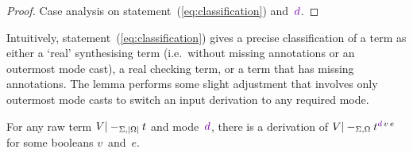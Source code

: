 \begin{proof}
Case analysis on statement~(\ref{eq:classification}) and~$\dir{d}$.
\end{proof}

Intuitively, statement~(\ref{eq:classification}) gives a precise classification of a term as either a `real' synthesising term (i.e.~without missing annotations or an outermost mode cast), a real checking term, or a term that has missing annotations.
The lemma performs some slight adjustment that involves only outermost mode casts to switch an input derivation to any required mode.

\begin{theorem}\label{thm:generalised-mode-preprocessing}
For any raw term $V |-_{\Sigma,\left|\Omega\right|} t$ and mode~$\dir{d}$, there is a derivation of\/ $V |-_{\Sigma,\Omega} t^{\dir{d}\,v\,e}$ for some booleans $v$~and~$e$.
\end{theorem}

